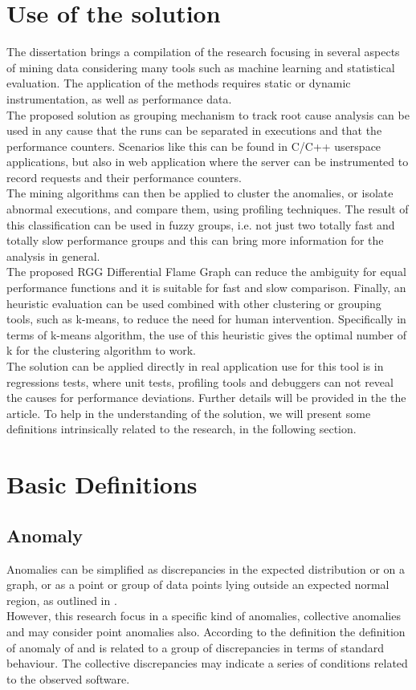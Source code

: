 \section{Use of the solution}  %
The dissertation brings a compilation of the research focusing in several aspects of mining data considering many tools such as machine learning and statistical evaluation. The application of the methods requires static or dynamic instrumentation, as well as performance data.\\
The proposed solution as grouping mechanism to track root cause analysis can be used in any cause that the runs can be separated in executions and that the performance counters. Scenarios like this can be found in C/C++ userspace applications, but also in web application where the server can be instrumented to record requests and their performance counters.\\
The mining algorithms can then be applied to cluster the anomalies, or isolate abnormal executions, and compare them, using profiling techniques. The result of this classification can be used in fuzzy groups, i.e. not just two totally fast and totally slow performance groups and this can bring more information for the analysis in general.\\
The proposed RGG Differential Flame Graph can reduce the ambiguity for equal performance functions and it is suitable for fast and slow comparison. 
Finally, an heuristic evaluation can be used combined with other clustering or grouping tools, such as k-means, to reduce the need for human intervention. Specifically in terms of k-means algorithm, the use of this heuristic gives the optimal number of k for the clustering algorithm to work. \\
The solution can be applied directly in real application use for this tool is in regressions tests, where unit tests, profiling tools and debuggers can not reveal the causes for performance deviations. Further details will be provided in the the article.
To help in the understanding of the solution, we will present some definitions intrinsically related to the research, in the following section.

\section{Basic Definitions}  %

\subsection{Anomaly}
Anomalies can be simplified as discrepancies in the expected distribution or on a graph, or as a point or group of data points lying outside an expected normal region, as outlined in \cite{das_detection}. \\
However, this research focus in a specific kind of anomalies, collective anomalies and may consider point anomalies also. According to the definition the definition of anomaly of \cite{Chandola2009ADS15418801541882} and is related to a group of discrepancies in terms of standard behaviour. The collective discrepancies may indicate a series of conditions related to the observed software.\\
